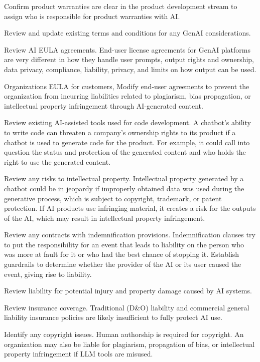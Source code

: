 \begin{minipage}{\linewidth}
\begin{checklist}
  \item Confirm product warranties are clear in the product development stream to assign who is responsible for product warranties with AI.
  \item Review and update existing terms and conditions for any GenAI considerations.
  \item Review AI EULA agreements. End-user license agreements for GenAI platforms are very different in how they handle user prompts, output rights and ownership, data privacy, compliance, liability, privacy, and limits on how output can be used.
  \item Organizations EULA for customers, Modify end-user agreements to prevent the organization from incurring liabilities related to plagiarism, bias propagation, or intellectual property infringement through AI-generated content.
  \item Review existing AI-assisted tools used for code development. A chatbot's ability to write code can threaten a company's ownership rights to its product if a chatbot is used to generate code for the product. For example, it could call into question the status and protection of the generated content and who holds the right to use the generated content.
  \item Review any risks to intellectual property. Intellectual property generated by a chatbot could be in jeopardy if improperly obtained data was used during the generative process, which is subject to copyright, trademark, or patent protection. If AI products use infringing material, it creates a risk for the outputs of the AI, which may result in intellectual property infringement.
  \item Review any contracts with indemnification provisions. Indemnification clauses try to put the responsibility for an event that leads to liability on the person who was more at fault for it or who had the best chance of stopping it. Establish guardrails to determine whether the provider of the AI or its user caused the event, giving rise to liability.
  \item Review liability for potential injury and property damage caused by AI systems.
  \item Review insurance coverage. Traditional (D\&O) liability and commercial general liability insurance policies are likely insufficient to fully protect AI use.
  \item Identify any copyright issues. Human authorship is required for copyright. An organization may also be liable for plagiarism, propagation of bias, or intellectual property infringement if LLM tools are misused.

\end{checklist}
\end{minipage}
